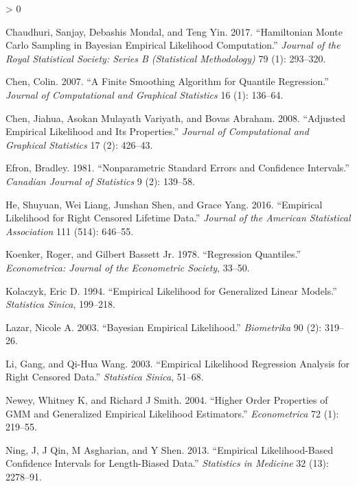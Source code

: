 \documentclass[article]{jss}
\newlength{\cslhangindent}
\newenvironment{CSLReferences}[2] %
 {%
  \setlength{\parindent}{0pt}
  \ifodd #1 \everypar{\setlength{\hangindent}{\cslhangindent}}\ignorespaces\fi
  \ifnum #2 > 0
  \setlength{\parskip}{#2\baselineskip}
  \fi
 }%
 {}
\renewcommand{\|}{\,|\,}
\begin{document}
\hypertarget{refs}{}
\begin{CSLReferences}{1}{0}
\leavevmode\hypertarget{ref-chaudhuri-et-al2017}{}%
Chaudhuri, Sanjay, Debashis Mondal, and Teng Yin. 2017. {``Hamiltonian Monte Carlo Sampling in Bayesian Empirical Likelihood Computation.''} \emph{Journal of the Royal Statistical Society: Series B (Statistical Methodology)} 79 (1): 293--320.

\leavevmode\hypertarget{ref-chen2007}{}%
Chen, Colin. 2007. {``A Finite Smoothing Algorithm for Quantile Regression.''} \emph{Journal of Computational and Graphical Statistics} 16 (1): 136--64.

\leavevmode\hypertarget{ref-chen-et-al2008}{}%
Chen, Jiahua, Asokan Mulayath Variyath, and Bovas Abraham. 2008. {``Adjusted Empirical Likelihood and Its Properties.''} \emph{Journal of Computational and Graphical Statistics} 17 (2): 426--43.

\leavevmode\hypertarget{ref-efron1981}{}%
Efron, Bradley. 1981. {``Nonparametric Standard Errors and Confidence Intervals.''} \emph{Canadian Journal of Statistics} 9 (2): 139--58.

\leavevmode\hypertarget{ref-he-et-al2016}{}%
He, Shuyuan, Wei Liang, Junshan Shen, and Grace Yang. 2016. {``Empirical Likelihood for Right Censored Lifetime Data.''} \emph{Journal of the American Statistical Association} 111 (514): 646--55.

\leavevmode\hypertarget{ref-koenker-bassett1978}{}%
Koenker, Roger, and Gilbert Bassett Jr. 1978. {``Regression Quantiles.''} \emph{Econometrica: Journal of the Econometric Society}, 33--50.

\leavevmode\hypertarget{ref-kolaczyk1994}{}%
Kolaczyk, Eric D. 1994. {``Empirical Likelihood for Generalized Linear Models.''} \emph{Statistica Sinica}, 199--218.

\leavevmode\hypertarget{ref-lazar2003}{}%
Lazar, Nicole A. 2003. {``Bayesian Empirical Likelihood.''} \emph{Biometrika} 90 (2): 319--26.

\leavevmode\hypertarget{ref-li-wang2003}{}%
Li, Gang, and Qi-Hua Wang. 2003. {``Empirical Likelihood Regression Analysis for Right Censored Data.''} \emph{Statistica Sinica}, 51--68.

\leavevmode\hypertarget{ref-newey-smith2004}{}%
Newey, Whitney K, and Richard J Smith. 2004. {``Higher Order Properties of GMM and Generalized Empirical Likelihood Estimators.''} \emph{Econometrica} 72 (1): 219--55.

\leavevmode\hypertarget{ref-ning-et-al2013}{}%
Ning, J, J Qin, M Asgharian, and Y Shen. 2013. {``Empirical Likelihood-Based Confidence Intervals for Length-Biased Data.''} \emph{Statistics in Medicine} 32 (13): 2278--91.


\end{CSLReferences}
\end{document}
